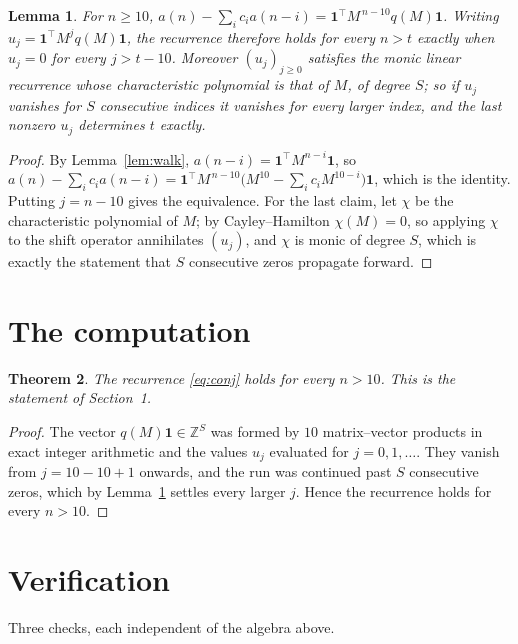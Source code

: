 \documentclass[11pt,a4paper]{article}
\theoremstyle{plain}
\newtheorem{theorem}{Theorem}
\newtheorem{lemma}[theorem]{Lemma}
\theoremstyle{definition}
\begin{document}
\begin{lemma}\label{lem:crit}
For $n\ge10$,
$a(n)-\sum_i c_i a(n-i)=\mathbf{1}^{\!\top}M^{\,n-10}q(M)\mathbf{1}$. Writing
$u_j=\mathbf{1}^{\!\top}M^{j}q(M)\mathbf{1}$, the recurrence therefore holds for every
$n>t$ exactly when $u_j=0$ for every $j>t-10$. Moreover $(u_j)_{j\ge0}$ satisfies the
monic linear recurrence whose characteristic polynomial is that of $M$, of degree $S$; so
if $u_j$ vanishes for $S$ consecutive indices it vanishes for every larger index, and the
last nonzero $u_j$ determines $t$ exactly.
\end{lemma}

\begin{proof}
By Lemma~\ref{lem:walk}, $a(n-i)=\mathbf{1}^{\!\top}M^{n-i}\mathbf{1}$, so
$a(n)-\sum_i c_i a(n-i)
=\mathbf{1}^{\!\top}M^{\,n-10}\bigl(M^{10}-\sum_i c_i M^{10-i}\bigr)
\mathbf{1}$, which is the identity. Putting $j=n-10$ gives the equivalence. For the
last claim, let $\chi$ be the characteristic polynomial of $M$; by Cayley--Hamilton
$\chi(M)=0$, so applying $\chi$ to the shift operator annihilates $(u_j)$, and $\chi$ is
monic of degree $S$, which is exactly the statement that $S$ consecutive zeros propagate
forward.
\end{proof}

\section{The computation}

\begin{theorem}
The recurrence \eqref{eq:conj} holds for every $n>10$. This is the statement of
Section~1.
\end{theorem}

\begin{proof}
The vector $q(M)\mathbf{1}\in\mathbb{Z}^{S}$ was formed by $10$ matrix--vector
products in exact integer arithmetic and the values $u_j$ evaluated for
$j=0,1,\dots$. They vanish from $j=10-10+1$ onwards, and the run was continued past
$S$ consecutive zeros, which by Lemma~\ref{lem:crit} settles every larger $j$. Hence the
recurrence holds for every $n>10$.
\end{proof}

\section{Verification}

Three checks, each independent of the algebra above.
\end{document}
